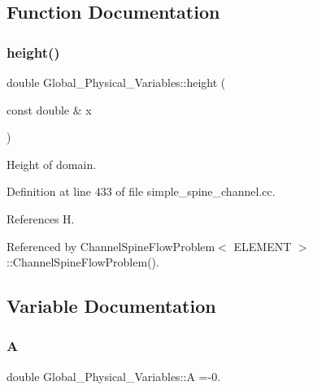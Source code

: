 \subsection{Function Documentation}
\mbox{\label{namespaceGlobal__Physical__Variables_aad3f0468efff43e7f235a64c27d3acf2}} 
\subsubsection{\texorpdfstring{height()}{height()}}
{\footnotesize\ttfamily double Global\+\_\+\+Physical\+\_\+\+Variables\+::height (\begin{DoxyParamCaption}\item[{const double \&}]{x }\end{DoxyParamCaption})}



Height of domain. 



Definition at line 433 of file simple\+\_\+spine\+\_\+channel.\+cc.



References H.



Referenced by Channel\+Spine\+Flow\+Problem$<$ E\+L\+E\+M\+E\+N\+T $>$\+::\+Channel\+Spine\+Flow\+Problem().



\subsection{Variable Documentation}
\mbox{\label{namespaceGlobal__Physical__Variables_a4894f9a3a9cbf84f00d0719f2841e624}} 
\subsubsection{\texorpdfstring{A}{A}}
{\footnotesize\ttfamily double Global\+\_\+\+Physical\+\_\+\+Variables\+::A =-\/0.}



